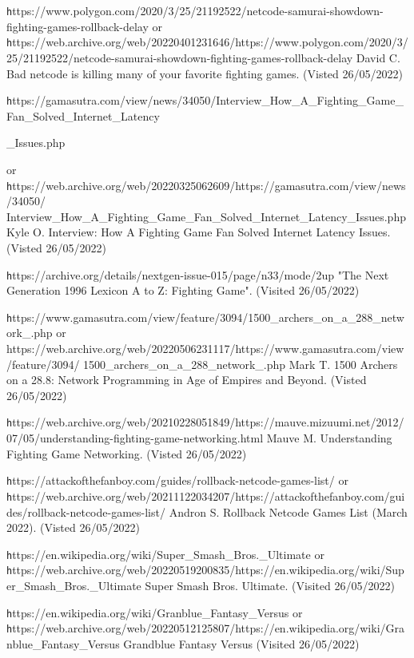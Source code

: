 \documentclass{entcs}
\begin{document}
\begin{thebibliography}{25}
 {\texttt https://www.polygon.com/2020/3/25/21192522/netcode-samurai-showdown-fighting-games-rollback-delay} or {\texttt https://web.archive.org/web/20220401231646/https://www.polygon.com/2020/3/25/21192522/netcode-samurai-showdown-fighting-games-rollback-delay} David C. Bad netcode is killing many of your favorite fighting
games. (Visted 26/05/2022)

 {\texttt https://gamasutra.com/view/news/34050/Interview\_How\_A\_Fighting\_Game\_Fan\_Solved\_Internet\_Latency

\_Issues.php} or {\texttt https://web.archive.org/web/20220325062609/https://gamasutra.com/view/news/34050/
Interview\_How\_A\_Fighting\_Game\_Fan\_Solved\_Internet\_Latency\_Issues.php} Kyle O. Interview: How A Fighting Game Fan Solved Internet Latency Issues. (Visted 26/05/2022)

 {\texttt https://archive.org/details/nextgen-issue-015/page/n33/mode/2up} "The Next Generation 1996 Lexicon A to Z: Fighting Game". (Visited 26/05/2022)

 {\texttt https://www.gamasutra.com/view/feature/3094/1500\_archers\_on\_a\_288\_network\_.php} or {https://web.archive.org/web/20220506231117/https://www.gamasutra.com/view/feature/3094/
1500\_archers\_on\_a\_288\_network\_.php} Mark T. 1500 Archers on a 28.8: Network Programming in Age of Empires and Beyond. (Visted 26/05/2022)

 {\texttt https://web.archive.org/web/20210228051849/https://mauve.mizuumi.net/2012/07/05/understanding-fighting-game-networking.html} Mauve M. Understanding Fighting Game Networking. (Visted 26/05/2022)

 {\texttt https://attackofthefanboy.com/guides/rollback-netcode-games-list/} or {\texttt https://web.archive.org/web/20211122034207/https://attackofthefanboy.com/guides/rollback-netcode-games-list/} Andron S. Rollback Netcode Games List (March 2022). (Visted 26/05/2022)

 {\texttt https://en.wikipedia.org/wiki/Super\_Smash\_Bros.\_Ultimate} or {\texttt https://web.archive.org/web/20220519200835/https://en.wikipedia.org/wiki/Super\_Smash\_Bros.\_Ultimate} Super Smash Bros. Ultimate. (Visited 26/05/2022)

 {\texttt https://en.wikipedia.org/wiki/Granblue\_Fantasy\_Versus} or {\texttt https://web.archive.org/web/20220512125807/https://en.wikipedia.org/wiki/Granblue\_Fantasy\_Versus} Grandblue Fantasy Versus (Visited 26/05/2022)


\end{thebibliography}
\end{document}
